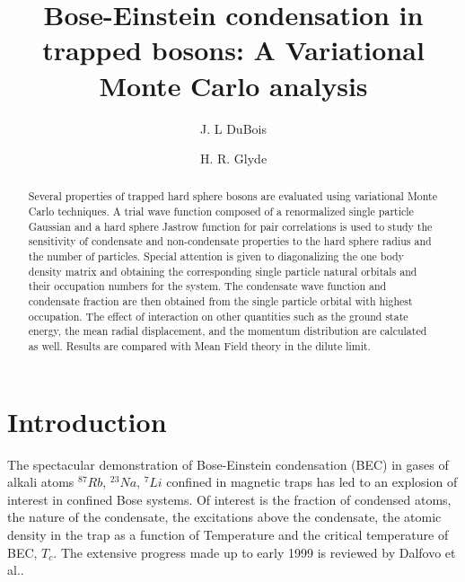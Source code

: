 \documentclass[aps,pra,twocolumn,groupedaddress]{revtex4}
\begin{document}


\title{Bose-Einstein condensation in trapped bosons: A Variational Monte Carlo analysis}
\author{J. L DuBois}
\author{H. R. Glyde}


\begin{abstract}
Several properties of trapped hard sphere bosons are evaluated
using variational Monte Carlo techniques.
A trial wave function composed of a renormalized single particle
Gaussian and a hard sphere Jastrow function for pair correlations
is used to study the sensitivity of condensate and 
non-condensate properties to the hard sphere radius and the number 
of particles.  Special attention is given to
diagonalizing the one body density matrix and obtaining the
corresponding single particle natural orbitals and their occupation
numbers for the system.
The condensate wave function and condensate fraction are then
obtained from the single particle orbital with highest occupation.
The effect of interaction on other quantities such as the ground
state energy, the mean radial displacement, and the momentum distribution are 
calculated as well.  Results are compared with Mean Field theory 
in the dilute limit.
\end{abstract}

\maketitle

\section{Introduction}

The spectacular demonstration of Bose-Einstein condensation (BEC) in gases of
alkali atoms $^{87}Rb$, $^{23}Na$, $^7Li$ confined in magnetic
traps\cite{anderson95,davis95,bradley95} has led to an explosion of interest in
confined Bose systems. Of interest is the fraction of condensed atoms, the
nature of the condensate, the excitations above the condensate, the atomic
density in the trap as a function of Temperature and the critical temperature of BEC,
$T_c$. The extensive progress made up to early 1999 is reviewed by Dalfovo et
al.\cite{dalfovo99}.
\end{document}
